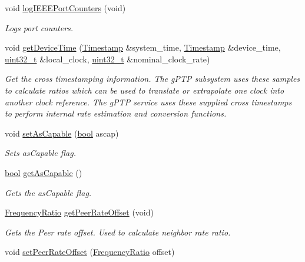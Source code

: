 \begin{DoxyCompactItemize}
void \hyperlink{class_common_port_a90b2bf70ecdd2df54ce464d19aa921a8}{log\+I\+E\+E\+E\+Port\+Counters} (void)
\begin{DoxyCompactList}\small\item\em Logs port counters. \end{DoxyCompactList}\item 
void \hyperlink{class_common_port_a16ab03ee31d5e246f05098d1e89f2537}{get\+Device\+Time} (\hyperlink{class_timestamp}{Timestamp} \&system\+\_\+time, \hyperlink{class_timestamp}{Timestamp} \&device\+\_\+time, \hyperlink{parse_8c_a6eb1e68cc391dd753bc8ce896dbb8315}{uint32\+\_\+t} \&local\+\_\+clock, \hyperlink{parse_8c_a6eb1e68cc391dd753bc8ce896dbb8315}{uint32\+\_\+t} \&nominal\+\_\+clock\+\_\+rate)
\begin{DoxyCompactList}\small\item\em Get the cross timestamping information. The g\+P\+TP subsystem uses these samples to calculate ratios which can be used to translate or extrapolate one clock into another clock reference. The g\+P\+TP service uses these supplied cross timestamps to perform internal rate estimation and conversion functions. \end{DoxyCompactList}\item 
void \hyperlink{class_common_port_a6f66d6a79abf9ead80338a891ebadcf3}{set\+As\+Capable} (\hyperlink{avb__gptp_8h_af6a258d8f3ee5206d682d799316314b1}{bool} ascap)
\begin{DoxyCompactList}\small\item\em Sets as\+Capable flag. \end{DoxyCompactList}\item 
\hyperlink{avb__gptp_8h_af6a258d8f3ee5206d682d799316314b1}{bool} \hyperlink{class_common_port_a329f27c73986ce1901d7e1064e2a5af1}{get\+As\+Capable} ()
\begin{DoxyCompactList}\small\item\em Gets the as\+Capable flag. \end{DoxyCompactList}\item 
\hyperlink{ptptypes_8hpp_a84de47dc2ed889ecd2b61706d3ad0f2e}{Frequency\+Ratio} \hyperlink{class_common_port_afc63c3fbddbf777d6e2792f1d27e35e2}{get\+Peer\+Rate\+Offset} (void)
\begin{DoxyCompactList}\small\item\em Gets the Peer rate offset. Used to calculate neighbor rate ratio. \end{DoxyCompactList}\item 
void \hyperlink{class_common_port_ab118c6ab2834f61ffc82e474d619ffb1}{set\+Peer\+Rate\+Offset} (\hyperlink{ptptypes_8hpp_a84de47dc2ed889ecd2b61706d3ad0f2e}{Frequency\+Ratio} offset)

\end{DoxyCompactItemize}
